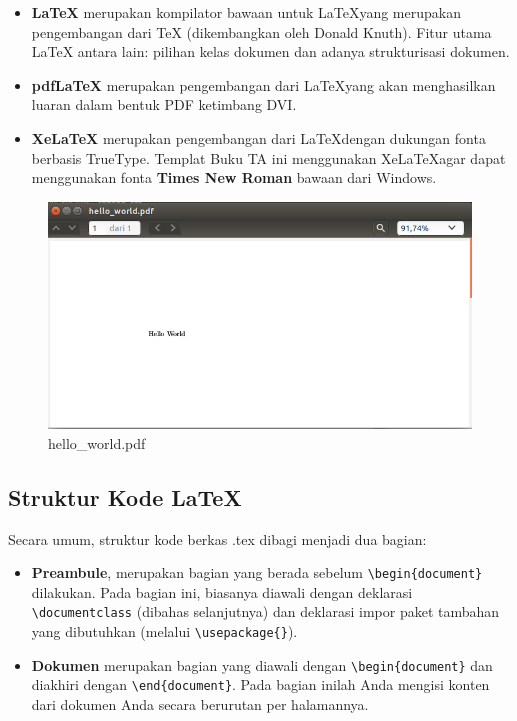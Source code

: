 \documentclass{ta-scientics-matematika-its}
\begin{document}
        \begin{itemize}
	        \item \textbf{\LaTeX} merupakan kompilator bawaan untuk \LaTeX yang merupakan pengembangan dari \TeX{} (dikembangkan oleh Donald Knuth). Fitur utama \LaTeX{} antara lain: pilihan kelas dokumen dan adanya strukturisasi dokumen.
	        \item \textbf{pdf\LaTeX} merupakan pengembangan dari \LaTeX yang akan menghasilkan luaran dalam bentuk PDF ketimbang DVI.
	        \item \textbf{Xe\LaTeX} merupakan pengembangan dari \LaTeX dengan dukungan fonta berbasis TrueType. Templat Buku TA ini menggunakan Xe\LaTeX agar dapat menggunakan fonta \textbf{Times New Roman} bawaan dari Windows.
        \end{itemize} 

		\begin{figure}[h]
			\centering
			\includegraphics[width=\linewidth]{contoh_img/hello_world.pdf.png}
			\caption{hello\_world.pdf}
			\label{gambarHelloWorldPDF}
		\end{figure}

		\subsection{Struktur Kode \LaTeX}
		Secara umum, struktur kode berkas .tex dibagi menjadi dua bagian:

		\begin{itemize}
			\item \textbf{Preambule}, merupakan bagian yang berada sebelum \texttt{\textbackslash{}begin\{document\}} dilakukan. Pada bagian ini, biasanya diawali dengan deklarasi \texttt{\textbackslash{}documentclass} (dibahas selanjutnya) dan deklarasi impor paket tambahan yang dibutuhkan (melalui \texttt{\textbackslash{}usepackage\{\}}).
			\item \textbf{Dokumen} merupakan bagian yang diawali dengan \texttt{\textbackslash{}begin\{document\}} dan diakhiri dengan \texttt{\textbackslash{}end\{document\}}. Pada bagian inilah Anda mengisi konten dari dokumen Anda secara berurutan per halamannya.
		\end{itemize}
\end{document}
